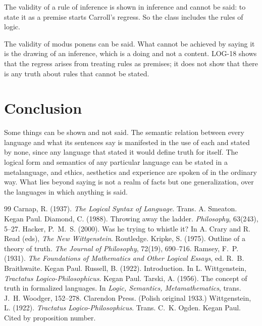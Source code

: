 \documentclass{situationist-preprint}
\begin{document}
\begin{objection}[Rules]\label{o:rules}
The validity of a rule of inference is shown in inference and cannot be said: to state it as a premise starts Carroll's regress. So the class includes the rules of logic.
\end{objection}

\begin{reply}
The validity of modus ponens can be said. What cannot be achieved by saying it is the drawing of an inference, which is a doing and not a content. LOG-18 shows that the regress arises from treating rules as premises; it does not show that there is any truth about rules that cannot be stated.
\end{reply}

\section{Conclusion}

Some things can be shown and not said. The semantic relation between every language and what its sentences say is manifested in the use of each and stated by none, since any language that stated it would define truth for itself. The logical form and semantics of any particular language can be stated in a metalanguage, and ethics, aesthetics and experience are spoken of in the ordinary way. What lies beyond saying is not a realm of facts but one generalization, over the languages in which anything is said.

\begin{thebibliography}{99}\small
{} Carnap, R. (1937). \emph{The Logical Syntax of Language}. Trans. A. Smeaton. Kegan Paul.
 Diamond, C. (1988). Throwing away the ladder. \emph{Philosophy}, 63(243), 5--27.
 Hacker, P.~M.~S. (2000). Was he trying to whistle it? In A. Crary and R. Read (eds), \emph{The New Wittgenstein}. Routledge.
 Kripke, S. (1975). Outline of a theory of truth. \emph{The Journal of Philosophy}, 72(19), 690--716.
 Ramsey, F.~P. (1931). \emph{The Foundations of Mathematics and Other Logical Essays}, ed. R.~B. Braithwaite. Kegan Paul.
 Russell, B. (1922). Introduction. In L. Wittgenstein, \emph{Tractatus Logico-Philosophicus}. Kegan Paul.
 Tarski, A. (1956). The concept of truth in formalized languages. In \emph{Logic, Semantics, Metamathematics}, trans. J.~H. Woodger, 152--278. Clarendon Press. (Polish original 1933.)
 Wittgenstein, L. (1922). \emph{Tractatus Logico-Philosophicus}. Trans. C.~K. Ogden. Kegan Paul. Cited by proposition number.
\end{thebibliography}
\end{document}
